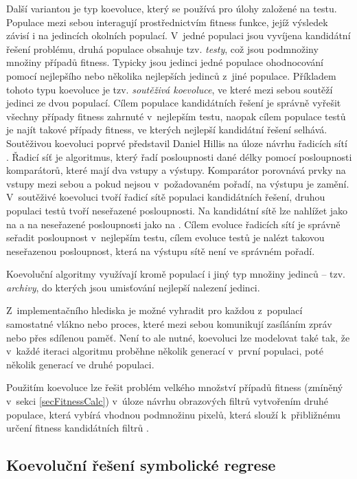 Další variantou je typ koevoluce, který se používá pro úlohy založené na testu. Populace mezi sebou interagují prostřednictvím fitness funkce, jejíž výsledek závisí i na jedincích okolních populací. V~jedné populaci jsou vyvíjena kandidátní řešení problému, druhá populace obsahuje tzv. \emph{testy}, což jsou podmnožiny množiny případů fitness. Typicky jsou jedinci jedné populace ohodnocování pomocí nejlepšího nebo několika nejlepších jedinců z~jiné populace. Příkladem tohoto typu koevoluce je tzv. \emph{soutěživá koevoluce}, ve které mezi sebou soutěží jedinci ze dvou populací. Cílem populace kandidátních řešení je správně vyřešit všechny případy fitness zahrnuté v~nejlepším testu, naopak cílem populace testů je najít takové případy fitness, ve kterých nejlepší kandidátní řešení selhává. Soutěživou koevoluci poprvé představil Daniel Hillis na úloze návrhu řadicích sítí \cite{Hillis}. Řadicí síť je algoritmus, který řadí posloupnosti dané délky pomocí posloupnosti komparátorů, které mají dva vstupy a výstupy. Komparátor porovnává prvky na vstupy mezi sebou a pokud nejsou v~požadovaném pořadí, na výstupu je zamění. V~soutěživé koevoluci tvoří řadicí sítě populaci kandidátních řešení, druhou populaci testů tvoří neseřazené posloupnosti. Na kandidátní sítě lze nahlížet jako na  a na neseřazené posloupnosti jako na . Cílem evoluce řadicích sítí je správně seřadit posloupnost v~nejlepším testu, cílem evoluce testů je nalézt takovou neseřazenou posloupnost, která na výstupu sítě není ve správném pořadí.

Koevoluční algoritmy využívají kromě populací i jiný typ množiny jedinců -- tzv. \emph{archivy}, do kterých jsou umisťování nejlepší nalezení jedinci.

Z~implementačního hlediska je možné vyhradit pro každou z~populací samostatné vlákno nebo proces, které mezi sebou komunikují zasíláním zpráv nebo přes sdílenou paměť. Není to ale nutné, koevoluci lze modelovat také tak, že v~každé iteraci algoritmu proběhne několik generací v~první populaci, poté několik generací ve druhé populaci.

Použitím koevoluce lze řešit problém velkého množství případů fitness (zmíněný v~sekci \ref{secFitnessCalc}) v~úloze návrhu obrazových filtrů vytvořením druhé populace, která vybírá vhodnou podmnožinu pixelů, která slouží k~přibližnému určení fitness kandidátních filtrů \cite{SikuPPSN}.


\subsection{Koevoluční řešení symbolické regrese}

